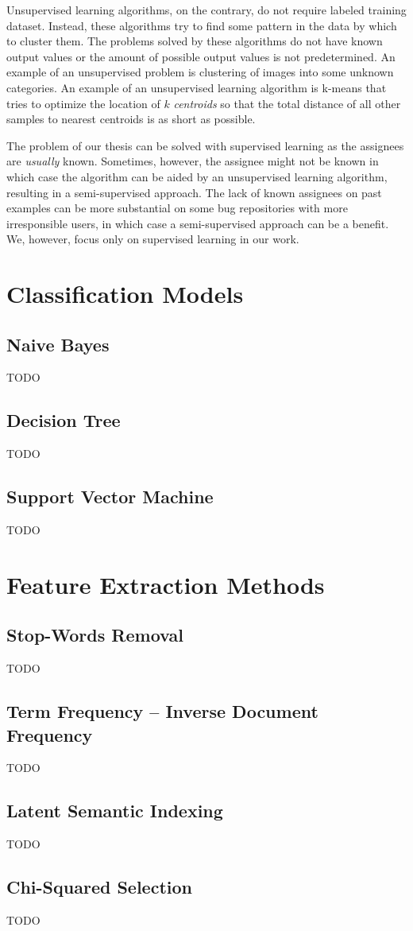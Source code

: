 Unsupervised learning algorithms, on the contrary, do not require labeled training dataset. Instead, these algorithms try to find some pattern in the data by which to cluster them. The problems solved by these algorithms do not have known output values or the amount of possible output values is not predetermined. An example of an unsupervised problem is clustering of images into some unknown categories. An example of an unsupervised learning algorithm is k-means that tries to optimize the location of $k$ \textit{centroids} so that the total distance of all other samples to nearest centroids is as short as possible.

The problem of our thesis can be solved with supervised learning as the assignees are \textit{usually} known. Sometimes, however, the assignee might not be known in which case the algorithm can be aided by an unsupervised learning algorithm, resulting in a semi-supervised approach. The lack of known assignees on past examples can be more substantial on some bug repositories with more irresponsible users, in which case a semi-supervised approach can be a benefit. We, however, focus only on supervised learning in our work.

\section{Classification Models}

\subsection{Naive Bayes}

TODO

\subsection{Decision Tree}

TODO

\subsection{Support Vector Machine}

TODO

\section{Feature Extraction Methods}

\subsection{Stop-Words Removal}

TODO

\subsection{Term Frequency -- Inverse Document Frequency}

TODO

\subsection{Latent Semantic Indexing}

TODO

\subsection{Chi-Squared Selection}

TODO